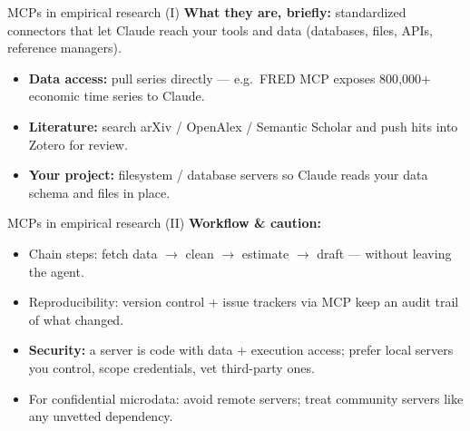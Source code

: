 \documentclass[10pt]{beamer}
\begin{document}
\begin{frame}{MCPs in empirical research (I)}
  \textbf{What they are, briefly:} standardized connectors that let Claude
  reach your tools and data (databases, files, APIs, reference managers).
  \begin{itemize}
    \item \textbf{Data access:} pull series directly --- e.g.\ FRED MCP exposes
          800{,}000+ economic time series to Claude.
    \item \textbf{Literature:} search arXiv / OpenAlex / Semantic Scholar and
          push hits into Zotero for review.
    \item \textbf{Your project:} filesystem / database servers so Claude reads
          your data schema and files in place.
  \end{itemize}
  \vfill
  \href{https://github.com/stefanoamorelli/fred-mcp-server}{}\quad
  \href{https://github.com/54yyyu/zotero-mcp}{}\quad
  \href{https://registry.modelcontextprotocol.io/}{}
\end{frame}

\begin{frame}{MCPs in empirical research (II)}
  \textbf{Workflow \& caution:}
  \begin{itemize}
    \item Chain steps: fetch data $\to$ clean $\to$ estimate $\to$ draft ---
          without leaving the agent.
    \item Reproducibility: version control + issue trackers via MCP keep an
          audit trail of what changed.
    \item \textbf{Security:} a server is code with data + execution access;
          prefer local servers you control, scope credentials, vet third-party ones.
    \item For confidential microdata: avoid remote servers; treat community
          servers like any unvetted dependency.
  \end{itemize}
  \vfill
  \href{https://owasp.org/www-community/attacks/MCP_Tool_Poisoning}{}\quad
  \href{https://github.com/hanlulong/awesome-ai-for-economists}{}
\end{frame}
\end{document}

